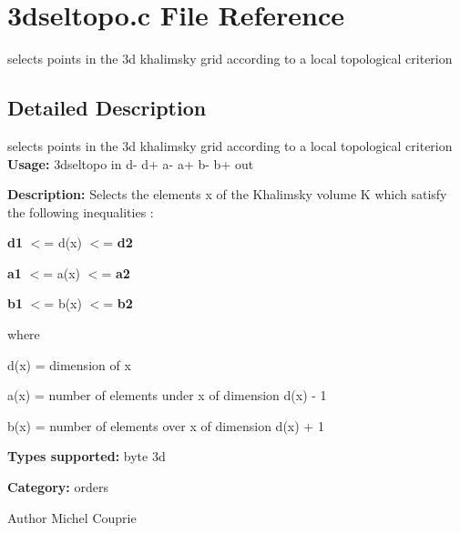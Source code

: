 \section{3dseltopo.c File Reference}
\label{3dseltopo_8c}


selects points in the 3d khalimsky grid according to a local topological criterion  




\subsection{Detailed Description}
selects points in the 3d khalimsky grid according to a local topological criterion {\bfseries Usage:} 3dseltopo in d-\/ d+ a-\/ a+ b-\/ b+ out

{\bfseries Description:} Selects the elements x of the Khalimsky volume K which satisfy the following inequalities :

{\bfseries d1} $<$= d(x) $<$= {\bfseries d2} 

{\bfseries a1} $<$= a(x) $<$= {\bfseries a2} 

{\bfseries b1} $<$= b(x) $<$= {\bfseries b2} 

where

d(x) = dimension of x

a(x) = number of elements under x of dimension d(x) -\/ 1

b(x) = number of elements over x of dimension d(x) + 1

{\bfseries Types supported:} byte 3d

{\bfseries Category:} orders

\begin{DoxyAuthor}{Author}
Michel Couprie 
\end{DoxyAuthor}
